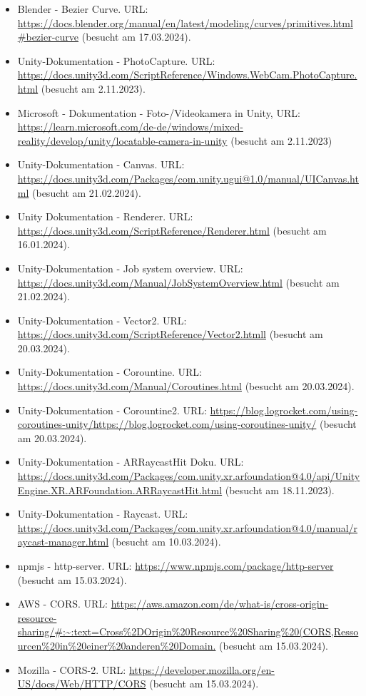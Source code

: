 \begin{itemize}
    \item Blender - Bezier Curve. URL: \url{https://docs.blender.org/manual/en/latest/modeling/curves/primitives.html#bezier-curve} (besucht am 17.03.2024).
    \item Unity-Dokumentation - PhotoCapture. URL:  \url{https://docs.unity3d.com/ScriptReference/Windows.WebCam.PhotoCapture.html} (besucht am 2.11.2023).
    \item Microsoft - Dokumentation - Foto-/Videokamera in Unity, URL:  \url{https://learn.microsoft.com/de-de/windows/mixed-reality/develop/unity/locatable-camera-in-unity} (besucht am 2.11.2023)
    \item Unity-Dokumentation -  Canvas. URL: \url{https://docs.unity3d.com/Packages/com.unity.ugui@1.0/manual/UICanvas.html} (besucht am 21.02.2024).
    \item Unity Dokumentation - Renderer. URL: \url{https://docs.unity3d.com/ScriptReference/Renderer.html} (besucht am 16.01.2024).
    \item Unity-Dokumentation - Job system overview. URL: \url{https://docs.unity3d.com/Manual/JobSystemOverview.html} (besucht am 21.02.2024).
    \item Unity-Dokumentation - Vector2. URL: \url{https://docs.unity3d.com/ScriptReference/Vector2.htmll} (besucht am 20.03.2024).
    \item Unity-Dokumentation - Corountine. URL: \url{https://docs.unity3d.com/Manual/Coroutines.html} (besucht am 20.03.2024).
    \item Unity-Dokumentation - Corountine2. URL: \url{https://blog.logrocket.com/using-coroutines-unity/https://blog.logrocket.com/using-coroutines-unity/} (besucht am 20.03.2024).
    \item Unity-Dokumentation - ARRaycastHit Doku. URL:  \url{https://docs.unity3d.com/Packages/com.unity.xr.arfoundation@4.0/api/UnityEngine.XR.ARFoundation.ARRaycastHit.html} (besucht am 18.11.2023).
    \item Unity-Dokumentation - Raycast. URL: \url{https://docs.unity3d.com/Packages/com.unity.xr.arfoundation@4.0/manual/raycast-manager.html} (besucht am 10.03.2024).
    \item npmjs - http-server. URL: \url{https://www.npmjs.com/package/http-server} (besucht am 15.03.2024).
    \item AWS - CORS. URL: \url{https://aws.amazon.com/de/what-is/cross-origin-resource-sharing/#:~:text=Cross%2DOrigin%20Resource%20Sharing%20(CORS,Ressourcen%20in%20einer%20anderen%20Domain.} (besucht am 15.03.2024).
    \item Mozilla - CORS-2. URL: \url{https://developer.mozilla.org/en-US/docs/Web/HTTP/CORS} (besucht am 15.03.2024).

\end{itemize}
